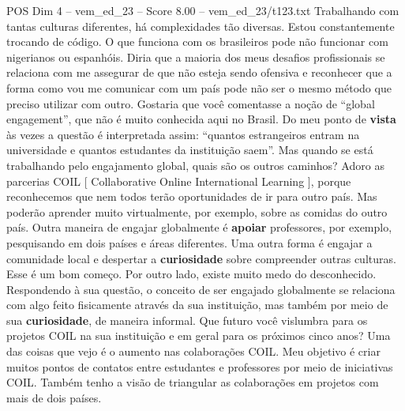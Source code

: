 \begin{textsample}{POS Dim 4 – vem\_ed\_23 – Score 8.00 – vem\_ed\_23/t123.txt}
Trabalhando com tantas culturas diferentes, há complexidades tão diversas.
Estou constantemente trocando de código.
O que funciona com os brasileiros pode não funcionar com nigerianos ou espanhóis.
Diria que a maioria dos meus desafios profissionais se relaciona com me assegurar de que não esteja sendo ofensiva e reconhecer que a forma como vou me comunicar com um país pode não ser o mesmo método que preciso utilizar com outro.
Gostaria que você comentasse a noção de “global engagement”, que não é muito conhecida aqui no Brasil.
Do meu ponto de \textbf{vista} às vezes a questão é interpretada assim: “quantos estrangeiros entram na universidade e quantos estudantes da instituição saem”.
Mas quando se está trabalhando pelo engajamento global, quais são os outros caminhos?
Adoro as parcerias COIL [ Collaborative Online International Learning ], porque reconhecemos que nem todos terão oportunidades de ir para outro país.
Mas poderão aprender muito virtualmente, por exemplo, sobre as comidas do outro país.
Outra maneira de engajar globalmente é \textbf{apoiar} professores, por exemplo, pesquisando em dois países e áreas diferentes.
Uma outra forma é engajar a comunidade local e despertar a \textbf{curiosidade} sobre compreender outras culturas.
Esse é um bom começo.
Por outro lado, existe muito medo do desconhecido.
Respondendo à sua questão, o conceito de ser engajado globalmente se relaciona com algo feito fisicamente através da sua instituição, mas também por meio de sua \textbf{curiosidade}, de maneira informal.
Que futuro você vislumbra para os projetos COIL na sua instituição e em geral para os próximos cinco anos?
Uma das coisas que vejo é o aumento nas colaborações COIL.
Meu objetivo é criar muitos pontos de contatos entre estudantes e professores por meio de iniciativas COIL.
Também tenho a visão de triangular as colaborações em projetos com mais de dois países.

\end{textsample}
